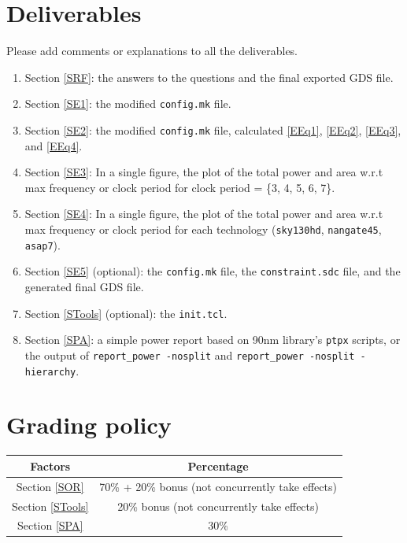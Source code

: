 \documentclass[a4paper,12pt,twoside]{article}
\begin{document}
\section{Deliverables}
Please add comments or explanations to all the deliverables.
\begin{enumerate}
    \item Section \ref{SRF}: the answers to the questions and the final exported GDS file.
    \item Section \ref{SE1}: the modified \texttt{config.mk} file.
    \item Section \ref{SE2}: the modified \texttt{config.mk} file, calculated \ref{EEq1}, \ref{EEq2}, \ref{EEq3}, and \ref{EEq4}.
    \item Section \ref{SE3}: In a single figure, the plot of the total power and area w.r.t max frequency or clock period for clock period = \{3, 4, 5, 6, 7\}.
    \item Section \ref{SE4}: In a single figure, the plot of the total power and area w.r.t max frequency or clock period for each technology (\texttt{sky130hd}, \texttt{nangate45}, \texttt{asap7}).
    \item Section \ref{SE5} (optional): the \texttt{config.mk} file, the \texttt{constraint.sdc} file, and the generated final GDS file.
    \item Section \ref{STools} (optional): the \texttt{init.tcl}.
    \item Section \ref{SPA}: a simple power report based on 90nm library's \texttt{ptpx} scripts, or the output of \verb|report_power -nosplit| and \verb|report_power -nosplit -hierarchy|.
\end{enumerate}

\section{Grading policy}
\begin{table}[H]
    \centering
    \begin{tabular}{|c|c|}
        \hline
        Factors & Percentage \\
        \hline
        Section \ref{SOR} & 70\% + 20\% bonus (not concurrently take effects)\\
        \hline
        Section \ref{STools} & 20\% bonus (not concurrently take effects)\\
        \hline
        Section \ref{SPA} & 30\% \\
        \hline
    \end{tabular}
\end{table}
\end{document}
